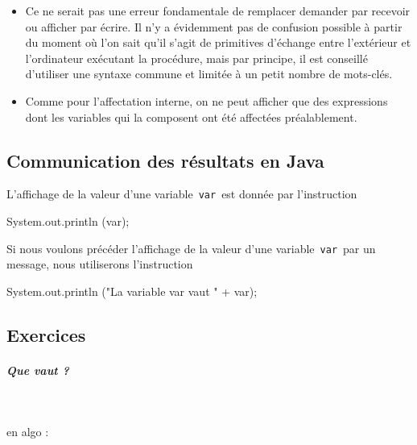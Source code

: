 \documentclass[11pt,a4paper]{article}
\begin{document}
					\begin{itemize}
				
			\item 
              Ce ne serait pas une erreur fondamentale de remplacer demander par recevoir ou afficher
              par \'ecrire. Il n'y a \'evidemment pas de confusion possible \`a partir du moment o\`u l'on
              sait qu'il s'agit de primitives d'\'echange entre l'ext\'erieur et l'ordinateur ex\'ecutant la
              proc\'edure, mais par principe, il est conseill\'e d'utiliser une syntaxe commune et limit\'ee
              \`a un petit nombre de mots-cl\'es.
            
			\item 
              Comme pour l'affectation interne, on ne peut afficher que des expressions dont les
              variables qui la composent ont \'et\'e affect\'ees pr\'ealablement.
            
					\end{itemize}
				
            \par
        \subsection{Communication des r\'esultats en Java}
          L'affichage de la valeur d'une variable \,\verb|var|\,  est donn\'ee par l'instruction
          
            \par
        \begin{Java}
 System.out.println (var);
				\end{Java}
          Si nous voulons pr\'ec\'eder l'affichage de la valeur d'une variable \,\verb|var|\,  par un message, 
          nous utiliserons l'instruction
        
            \par
        \begin{Java}
 System.out.println ("La variable var vaut " + var);
				\end{Java}\subsection{Exercices}
			
		\subparagraph{Que vaut ?} 
		
                \textcolor{white}{.} \par
            
							  en algo :
							
\end{document}
